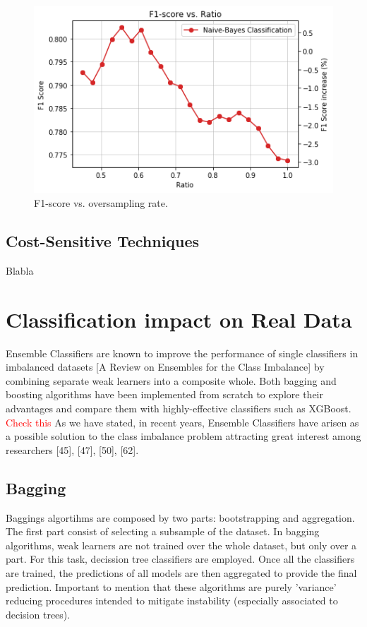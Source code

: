 \documentclass[conference]{IEEEtran}
\begin{document}
	\begin{figure}
		\includegraphics[scale=0.3]{Oversampling_F1_Score}
		\centering
		\caption{F1-score vs. oversampling rate.}
		\label{fig:Oversampling_F1_Score}
	\end{figure}

	\subsection{Cost-Sensitive Techniques}
	Blabla

\section{Classification impact on Real Data}
Ensemble Classifiers are known to improve the performance of single classifiers in imbalanced datasets [A Review on Ensembles for the Class Imbalance] by combining separate weak learners into a composite whole. Both bagging and boosting algorithms have been implemented from scratch to explore their advantages and compare them with highly-effective classifiers such as XGBoost. 
	\textcolor{red}{Check this}
As we have stated, in recent years, Ensemble Classifiers have arisen as a possible solution to the class imbalance problem attracting great interest among researchers [45], [47], [50], [62].

\subsection{Bagging}
Baggings algortihms are composed by two parts: bootstrapping and aggregation. The first part consist of selecting a subsample of the dataset. In bagging algorithms, weak learners are not trained over the whole dataset, but only over a part. For this task, decission tree classifiers are employed. Once all the classifiers are trained, the predictions of all models are then aggregated to provide the final prediction. Important to mention that these algorithms are purely 'variance' reducing procedures intended to mitigate instability (especially associated to decision trees). 
\end{document}
